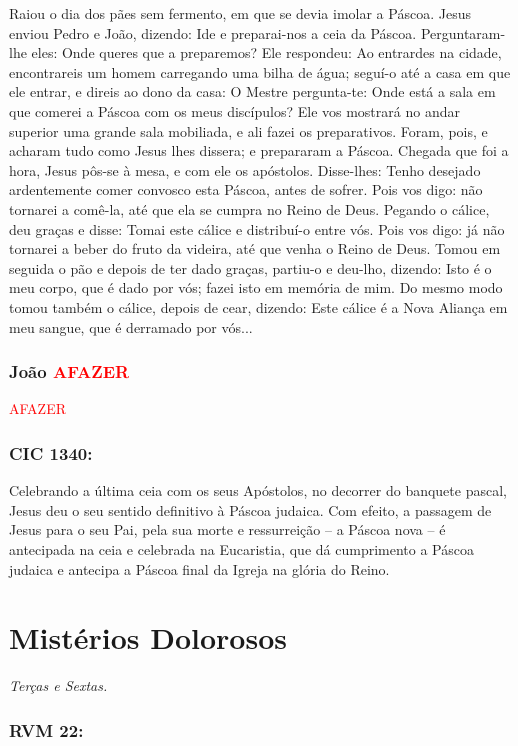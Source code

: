 \documentclass[10pt,a5paper]{book}
\newcommand{\from}[1]{\subsection*{#1}}
\newcommand{\TODO}{\textcolor{red}{\ttfamily AFAZER}}
\begin{document}
Raiou o dia dos pães sem fermento, em que se devia imolar a Páscoa.
Jesus enviou Pedro e João, dizendo: Ide e preparai-nos a ceia da Páscoa.
Perguntaram-lhe eles: Onde queres que a preparemos?
Ele respondeu: Ao entrardes na cidade, encontrareis um homem carregando uma bilha de água; seguí-o até a casa em que ele entrar,
e direis ao dono da casa: O Mestre pergunta-te: Onde está a sala em que comerei a Páscoa com os meus discípulos?
Ele vos mostrará no andar superior uma grande sala mobiliada, e ali fazei os preparativos.
Foram, pois, e acharam tudo como Jesus lhes dissera; e prepararam a Páscoa.
Chegada que foi a hora, Jesus pôs-se à mesa, e com ele os apóstolos.
Disse-lhes: Tenho desejado ardentemente comer convosco esta Páscoa, antes de sofrer.
Pois vos digo: não tornarei a comê-la, até que ela se cumpra no Reino de Deus.
Pegando o cálice, deu graças e disse: Tomai este cálice e distribuí-o entre vós.
Pois vos digo: já não tornarei a beber do fruto da videira, até que venha o Reino de Deus.
Tomou em seguida o pão e depois de ter dado graças, partiu-o e deu-lho, dizendo: Isto é o meu corpo, que é dado por vós; fazei isto em memória de mim.
Do mesmo modo tomou também o cálice, depois de cear, dizendo: Este cálice é a Nova Aliança em meu sangue, que é derramado por vós...

\from{João \TODO}

\TODO

\from{CIC 1340:}

Celebrando a última ceia com os seus Apóstolos, no decorrer do banquete pascal, Jesus deu o seu sentido definitivo à Páscoa judaica. Com efeito, a passagem de Jesus para o seu Pai, pela sua morte e ressurreição -- a Páscoa nova -- é antecipada na ceia e celebrada na Eucaristia, que dá cumprimento a Páscoa judaica e antecipa a Páscoa final da Igreja na glória do Reino.


\chapter{Mistérios Dolorosos}

\emph{Terças e Sextas.}

\from{RVM 22:}
\end{document}
